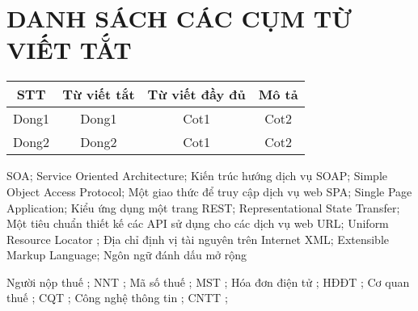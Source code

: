 \newpage
\section*{\centering DANH SÁCH CÁC CỤM TỪ VIẾT TẮT}


\begin{table}[h]
\centering
\begin{tabular}{|c|c|c|c|}
\hline
STT & Từ viết tắt & Từ viết đầy đủ & Mô tả \\
\hline
Dong1 & Dong1 & Cot1 & Cot2 \\
\hline
Dong2 & Dong2 & Cot1 & Cot2 \\
\hline
\end{tabular}
\end{table}

\newpage


SOA; Service Oriented Architecture; Kiến trúc hướng dịch vụ
SOAP; Simple Object Access Protocol; Một giao thức để truy cập dịch vụ web
SPA; Single Page Application; Kiểu ứng dụng một trang
REST; Representational State Transfer; Một tiêu chuẩn thiết kế các API sử dụng cho các dịch vụ web
URL; Uniform Resource Locator ; Địa chỉ định vị tài nguyên trên Internet
XML; Extensible Markup Language; Ngôn ngữ đánh dấu mở rộng

Người nộp thuế ; NNT ;
Mã số thuế ; MST ;
Hóa đơn điện tử ; HĐĐT ;
Cơ quan thuế ; CQT ;
Công nghệ thông tin ; CNTT ;

